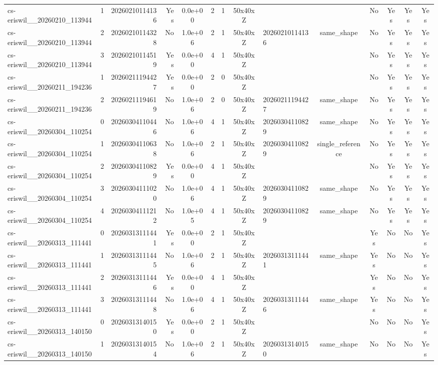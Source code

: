 \begin{table}[t]
{\begin{tabular}{lrrrcccclccccc}
cs-eriswil\_\_20260210\_113944 & 1 & 20260210114136 & Yes & 0.0e+00 & 2 & 1 & 50x40xZ &  &  & No & Yes & Yes & Yes \\
cs-eriswil\_\_20260210\_113944 & 2 & 20260210114328 & No & 1.0e+06 & 2 & 1 & 50x40xZ & 20260210114136 & same\_shape & No & Yes & Yes & Yes \\
cs-eriswil\_\_20260210\_113944 & 3 & 20260210114519 & Yes & 0.0e+00 & 4 & 1 & 50x40xZ &  &  & No & Yes & Yes & Yes \\
cs-eriswil\_\_20260211\_194236 & 1 & 20260211194427 & Yes & 0.0e+00 & 2 & 0 & 50x40xZ &  &  & No & Yes & Yes & Yes \\
cs-eriswil\_\_20260211\_194236 & 2 & 20260211194619 & No & 1.0e+06 & 2 & 0 & 50x40xZ & 20260211194427 & same\_shape & No & Yes & Yes & Yes \\
cs-eriswil\_\_20260304\_110254 & 0 & 20260304110446 & No & 1.0e+06 & 4 & 1 & 50x40xZ & 20260304110829 & same\_shape & No & Yes & Yes & Yes \\
cs-eriswil\_\_20260304\_110254 & 1 & 20260304110638 & No & 1.0e+06 & 2 & 1 & 50x40xZ & 20260304110829 & single\_reference & No & Yes & Yes & Yes \\
cs-eriswil\_\_20260304\_110254 & 2 & 20260304110829 & Yes & 0.0e+00 & 4 & 1 & 50x40xZ &  &  & No & Yes & Yes & Yes \\
cs-eriswil\_\_20260304\_110254 & 3 & 20260304111020 & No & 1.0e+06 & 4 & 1 & 50x40xZ & 20260304110829 & same\_shape & No & Yes & Yes & Yes \\
cs-eriswil\_\_20260304\_110254 & 4 & 20260304111212 & No & 1.0e+05 & 4 & 1 & 50x40xZ & 20260304110829 & same\_shape & No & Yes & Yes & Yes \\
cs-eriswil\_\_20260313\_111441 & 0 & 20260313111441 & Yes & 0.0e+00 & 2 & 1 & 50x40xZ &  &  & Yes & No & No & Yes \\
cs-eriswil\_\_20260313\_111441 & 1 & 20260313111445 & No & 1.0e+06 & 2 & 1 & 50x40xZ & 20260313111441 & same\_shape & Yes & No & No & Yes \\
cs-eriswil\_\_20260313\_111441 & 2 & 20260313111446 & Yes & 0.0e+00 & 4 & 1 & 50x40xZ &  &  & Yes & No & No & Yes \\
cs-eriswil\_\_20260313\_111441 & 3 & 20260313111448 & No & 1.0e+06 & 4 & 1 & 50x40xZ & 20260313111446 & same\_shape & Yes & No & No & Yes \\
cs-eriswil\_\_20260313\_140150 & 0 & 20260313140150 & Yes & 0.0e+00 & 2 & 1 & 50x40xZ &  &  & No & No & No & Yes \\
cs-eriswil\_\_20260313\_140150 & 1 & 20260313140154 & No & 1.0e+06 & 2 & 1 & 50x40xZ & 20260313140150 & same\_shape & No & No & No & Yes \\

\end{tabular}}
\end{table}
